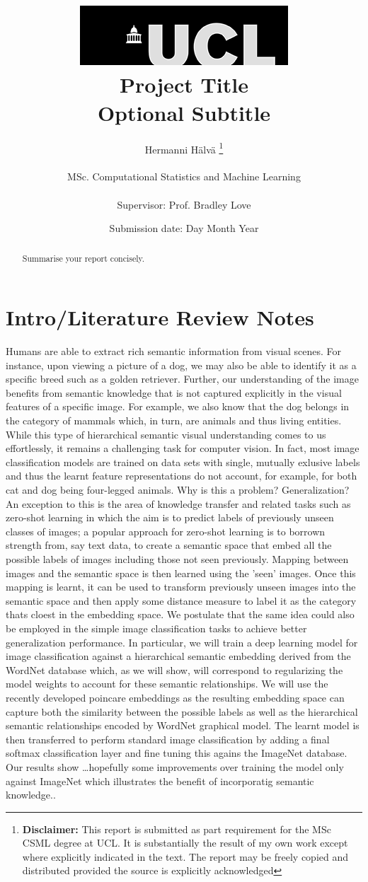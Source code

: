 \documentclass{report}
\title{  	{ \includegraphics[scale=.5]{ucl_logo.png}}\\
{{\Huge Project Title}}\\
{\large Optional Subtitle}\\
		}
\date{Submission date: Day Month Year}
\author{Hermanni H{\"a}lv{\"a} \thanks{
{\bf Disclaimer:}
This report is submitted as part requirement for the MSc CSML degree at UCL. It is
substantially the result of my own work except where explicitly indicated in the text.
The report may be freely copied and distributed provided the source is explicitly acknowledged
\newline  %
}
\\ \\
MSc. Computational Statistics and Machine Learning\\ \\
Supervisor: Prof. Bradley Love}
\begin{document}
 
 \onehalfspacing
\maketitle
\begin{abstract}
Summarise your report concisely.
\end{abstract}
\tableofcontents
\setcounter{page}{1}



\chapter{Intro/Literature Review Notes}

Humans are able to extract rich semantic information from visual scenes. For instance, upon viewing a picture of a dog, we may also be able to identify it as a specific breed such as a golden retriever. Further, our understanding of the image benefits from semantic knowledge that is not captured explicitly in the visual features of a specific image. For example, we also know that the dog belongs in the category of mammals which, in turn, are animals and thus living entities. While this type of hierarchical semantic visual understanding comes to us effortlessly, it remains a challenging task for computer vision. In fact, most image classification models are trained on data sets with single, mutually exlusive labels and thus the learnt feature representations do not account, for example, for both cat and dog being four-legged animals. Why is this a problem? Generalization?  An exception to this is the area of knowledge transfer and related tasks such as zero-shot learning in which the aim is to predict labels of previously unseen classes of images; a popular approach for zero-shot learning is to borrown strength from, say text data, to create a semantic space that embed all the possible labels of images including those not seen previously. Mapping between images and the semantic space is then learned using the 'seen' images. Once this mapping is learnt, it can be used to transform previously unseen images into the semantic space and then apply some distance measure to label it as the category thats cloest in the embedding space. We postulate that the same idea could also be employed in the simple image classification tasks to achieve better generalization performance. In particular, we will train a deep learning model for image classification against a hierarchical semantic embedding derived from the WordNet database which, as we will show, will correspond to regularizing the model weights to account for these semantic relationships. We will use the recently developed poincare embeddings as the resulting embedding space can capture both the similarity between the possible labels as well as the hierarchical semantic relationships encoded by WordNet graphical model. The learnt model is then transferred to perform standard image classification by adding a final softmax classification layer and fine tuning this agains the ImageNet database. Our results show \dots hopefully some improvements over training the model only against ImageNet which illustrates the benefit of incorporatig semantic knowledge.. \\
\end{document}
